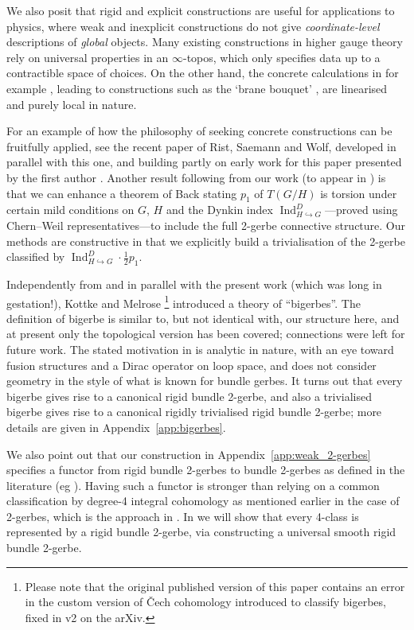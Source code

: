 \documentclass[12pt]{amsart}
\DeclareMathOperator{\Ind}{Ind}
\theoremstyle{plain}
\theoremstyle{definition}
\theoremstyle{remark}
\numberwithin{equation}{section}
\newcommand{\<}{\langle}
\renewcommand{\>}{\rangle}
\def\into {\hookrightarrow}
\begin{document}
We also posit that rigid and explicit constructions are useful for applications to physics, where weak and inexplicit constructions do not give \emph{coordinate-level} descriptions of \emph{global} objects. 
Many existing constructions in higher gauge theory rely on universal properties in an $\infty$-topos, which only specifies data up to a contractible space of choices.
On the other hand, the concrete calculations in for example \cite{FiorenzaSchreiberStasheff_12}, leading to constructions such as the `brane bouquet' \cite{Fiorenza-Sati-Schreiber_15b}, are linearised and purely local in nature.

For an example of how the philosophy of seeking concrete constructions can be fruitfully applied, see the recent paper \cite{RSW_22} of Rist, Saemann and Wolf, developed in parallel with this one, and building partly on early work for this paper presented by the first author \cite{Roberts_14}.
Another result following from our work (to appear in \cite{rb2g_III}) is that we can enhance a theorem of Back \cite{Back_81} stating $p_1$ of $T(G/H)$ is torsion under certain mild conditions on $G$, $H$ and the Dynkin index $\Ind^D_{H\into G}$---proved using Chern--Weil representatives---to include the full 2-gerbe connective structure.
Our methods are constructive in that we explicitly build a trivialisation of the 2-gerbe classified by $\Ind^D_{H\into G}\cdot \frac12 p_1$.

Independently from and in parallel with the present work (which was long in gestation!), Kottke and Melrose \cite{KM19}\footnote{Please note that the original published version of this paper contains an error in the custom version of \v{C}ech cohomology introduced to classify bigerbes, fixed in v2 on the arXiv.} introduced a theory of ``bigerbes''.
The definition of bigerbe is similar to, but not identical with, our structure here, and at present only the topological version has been covered; connections were left for future work. 
The stated motivation in \cite{KM19} is analytic in nature, with an eye toward fusion structures and a Dirac operator on loop space, and does not consider geometry in the style of what is known for bundle gerbes.
It turns out that every bigerbe gives rise to a canonical rigid bundle 2-gerbe, and also a trivialised bigerbe gives rise to a canonical rigidly trivialised rigid bundle 2-gerbe; more details are given in Appendix~\ref{app:bigerbes}.

We also point out that our construction in Appendix~\ref{app:weak_2-gerbes} specifies a functor from rigid bundle 2-gerbes to bundle 2-gerbes as defined in the literature (eg \cite{Ste,Wal}). 
Having such a functor is stronger than relying on a common classification by degree-4 integral cohomology as mentioned earlier in the case of 2-gerbes, which is the approach in \cite{KM19}.
In \cite{rb2g_II} we will show that every 4-class is represented by a rigid bundle 2-gerbe, via constructing a universal smooth rigid bundle 2-gerbe.
\end{document}
